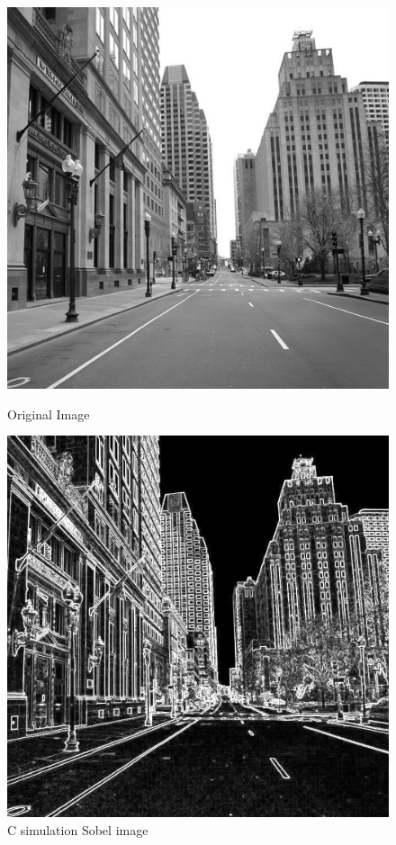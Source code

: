 \begin{figure}[tb!]
\centering
    \begin{minipage}[b]{0.47\textwidth}
        \centering
        \includegraphics[width=\textwidth]{images/validation/street1024.png}
        \caption{Original Image}
        \label{fig:orig_street}
    \end{minipage}
\hspace{0.5cm}
    \begin{minipage}[b]{0.47\textwidth}
        \centering
        \includegraphics[width=\textwidth]{images/validation/c_street1024.png}
        \caption{C simulation Sobel image}
        \label{fig:c_street0}
    \end{minipage}
\end{figure}

